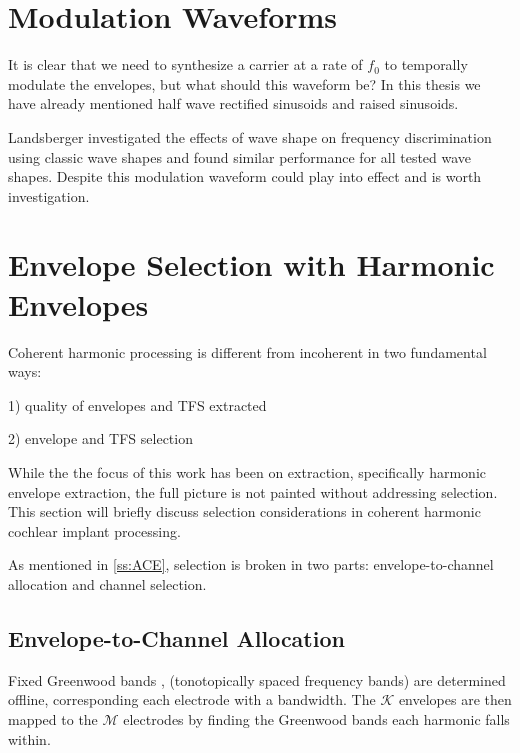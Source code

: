 \documentclass [11pt, proquest,oneside] {ganter_thesis}[2015/03/03]
\begin{document}
\section{Modulation Waveforms}
It is clear that we need to synthesize a carrier at a rate of $f_0$ to temporally modulate the envelopes, but what should this waveform be?  In this thesis we have already mentioned half wave rectified sinusoids and raised sinusoids.

Landsberger \cite{landsberger2008effects} investigated the effects of wave shape on frequency discrimination using classic wave shapes and found similar performance for all tested wave shapes.  Despite this modulation waveform could play into effect and is worth investigation.



\section{Envelope Selection with Harmonic Envelopes}

Coherent harmonic processing is different from incoherent in two fundamental ways:

1) quality of envelopes and TFS extracted

2) envelope and TFS selection

While the the focus of this work has been on extraction, specifically harmonic envelope extraction, the full picture is not painted without addressing selection.  This section will briefly discuss selection considerations in coherent harmonic cochlear implant processing.

As mentioned in \ref{ss:ACE}, selection is broken in two parts: envelope-to-channel allocation and channel selection.

\subsection{Envelope-to-Channel Allocation}

Fixed Greenwood bands \cite{greenwood1961critical}, (tonotopically spaced frequency bands) are determined offline, corresponding each electrode with a bandwidth.  The $\mathcal{K}$ envelopes are then mapped to the $\mathcal{M}$ electrodes by finding the Greenwood bands each harmonic falls within.
\end{document}
